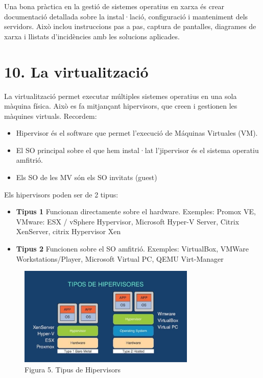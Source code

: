 \documentclass[
  a4paper,
]{article}
\providecommand{\tightlist}{%
  \setlength{\itemsep}{0pt}\setlength{\parskip}{0pt}}
\begin{document}
Una bona pràctica en la gestió de sistemes operatius en xarxa és crear
documentació detallada sobre la instal·lació, configuració i manteniment
dels servidors. Això inclou instruccions pas a pas, captura de
pantalles, diagrames de xarxa i llistats d'incidències amb les solucions
aplicades.

\section{10. La virtualització}\label{la-virtualitzaciuxf3}

La virtualització permet executar múltiples sistemes operatius en una
sola màquina física. Això es fa mitjançant hipervisors, que creen i
gestionen les màquines virtuals. Recordem:

\begin{itemize}
\tightlist
\item
  Hipervisor és el software que permet l'execució de Máquinas Virtuales
  (VM).
\item
  El SO principal sobre el que hem instal·lat l'jipervisor és el sistema
  operatiu amfitrió.
\item
  Els SO de les MV són els SO invitats (guest)
\end{itemize}

Els hipervisors poden ser de 2 tipus:

\begin{itemize}
\item
  \textbf{Tipus 1} Funcionan directamente sobre el hardware. Exemples:
  Promox VE, VMware: ESX / vSphere Hypervisor, Microsoft Hyper-V Server,
  Citrix XenServer, citrix Hypervisor Xen
\item
  \textbf{Tipus 2} Funcionen sobre el SO amfitrió. Exemples: VirtualBox,
  VMWare Workstations/Player, Microsoft Virtual PC, QEMU Virt-Manager
\end{itemize}

\begin{figure}
\centering
\includegraphics[width=0.75\textwidth,height=\textheight]{png/tiposVirtualizadores.jpg}
\caption{Figura 5. Tipus de Hipervisors}
\end{figure}
\end{document}
